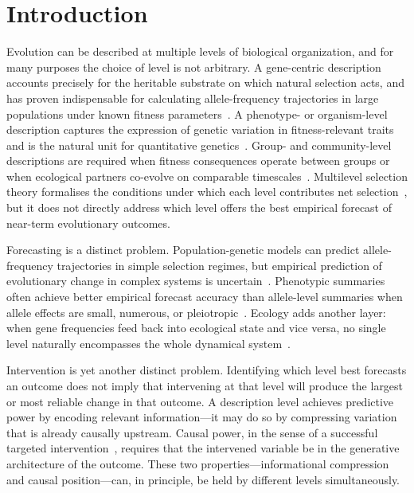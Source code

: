 \documentclass[11pt,a4paper]{article}
\begin{document}
\section{Introduction}
\label{sec:intro}

Evolution can be described at multiple levels of biological organization,
and for many purposes the choice of level is not arbitrary.
A gene-centric description~\citep{Dawkins1976, Williams1966} accounts precisely
for the heritable substrate on which natural selection acts, and has proven
indispensable for calculating allele-frequency trajectories in large populations
under known fitness parameters~\citep{Fisher1930, Wright1931, Crow1970}.
A phenotype- or organism-level description captures the expression of genetic
variation in fitness-relevant traits and is the natural unit for quantitative
genetics~\citep{Falconer1996, Lynch1998, Lande1979}.
Group- and community-level descriptions are required when fitness consequences
operate between groups or when ecological partners co-evolve on
comparable timescales~\citep{Wilson1975, Hamilton1964, Nowak2006,
Post2009, Pelletier2009, Schoener2011}.
Multilevel selection theory formalises the conditions under which each level
contributes net selection~\citep{Price1970, Hamilton1975, Frank1995,
Okasha2006, Kerr2002}, but it does not directly address which level offers
the best empirical forecast of near-term evolutionary outcomes.

Forecasting is a distinct problem.
Population-genetic models can predict allele-frequency trajectories in simple
selection regimes, but empirical prediction of evolutionary change in complex
systems is uncertain~\citep{Barton2002, Orr2009, Nosil2017}.
Phenotypic summaries often achieve better empirical forecast accuracy than
allele-level summaries when allele effects are small, numerous, or
pleiotropic~\citep{Meuwissen2001, Goddard2010, Wray2013}.
Ecology adds another layer: when gene frequencies feed back into ecological
state and vice versa, no single level naturally encompasses the whole
dynamical system~\citep{Hairston2005, Yoshida2003, Ellner2011, Hendry2016}.

Intervention is yet another distinct problem.
Identifying which level best forecasts an outcome does not imply that intervening
at that level will produce the largest or most reliable change in that outcome.
A description level achieves predictive power by encoding relevant information---it
may do so by compressing variation that is already causally upstream.
Causal power, in the sense of a successful targeted intervention~\citep{Pearl2009,
Woodward2003, Spirtes2000}, requires that the intervened variable be in the
generative architecture of the outcome.
These two properties---informational compression and causal position---can,
in principle, be held by different levels simultaneously.
\end{document}
